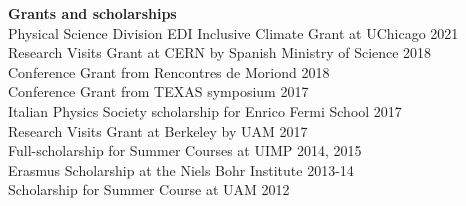 \documentclass[11pt,a4paper]{article}
\newcommand{\contsizelong}{0.95\linewidth}
\begin{document}
\begin{minipage}[t]{\contsizelong}
\begin{flushleft}
\vspace{5pt}
\textbf{Grants and scholarships} \\
Physical Science Division EDI Inclusive Climate Grant at UChicago \hfill 2021 \\%
{Research Visits Grant} at CERN by Spanish Ministry of Science \hfill 2018 \\%
{Conference Grant} from Rencontres de Moriond \hfill 2018 \\%
{Conference Grant} from TEXAS symposium \hfill 2017 \\%
{Italian Physics Society scholarship} for Enrico Fermi School \hfill 2017 \\%
{Research Visits Grant} at Berkeley by UAM \hfill 2017 \\%
{Full-scholarship} for Summer Courses at UIMP \hfill 2014, 2015 \\%
{Erasmus Scholarship} at the Niels Bohr Institute \hfill 2013-14 \\
{Scholarship} for Summer Course at UAM \hfill 2012 %
\end{flushleft}
\end{minipage}
\end{document}
